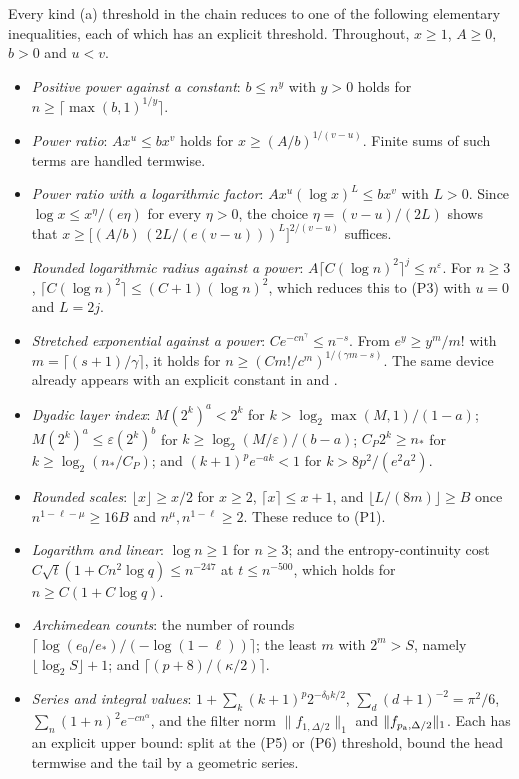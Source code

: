 \documentclass[11pt]{article}
\newcommand{\eps}{\varepsilon}
\begin{document}
Every kind (a) threshold in the chain reduces to one of the following
elementary inequalities, each of which has an explicit threshold. Throughout,
$x\ge1$, $A\ge0$, $b>0$ and $u<v$.
\begin{itemize}
    \item[(P1)] \emph{Positive power against a constant}: $b\le n^y$ with
          $y>0$ holds for $n\ge\lceil\max(b,1)^{1/y}\rceil$.
    \item[(P2)] \emph{Power ratio}: $Ax^u\le bx^v$ holds for
          $x\ge(A/b)^{1/(v-u)}$. Finite sums of such terms are handled termwise.
    \item[(P3)] \emph{Power ratio with a logarithmic factor}:
          $Ax^u(\log x)^L\le bx^v$ with $L>0$. Since
          $\log x\le x^\eta/(e\eta)$ for every $\eta>0$, the choice
          $\eta=(v-u)/(2L)$ shows that
          $x\ge\bigl[(A/b)\,(2L/(e(v-u)))^L\bigr]^{2/(v-u)}$ suffices.
    \item[(P4)] \emph{Rounded logarithmic radius against a power}:
          $A\lceil C(\log n)^2\rceil^j\le n^\eps$. For $n\ge3$,
          $\lceil C(\log n)^2\rceil\le(C+1)(\log n)^2$, which reduces this to
          (P3) with $u=0$ and $L=2j$.
    \item[(P5)] \emph{Stretched exponential against a power}:
          $Ce^{-cn^\gamma}\le n^{-s}$. From $e^y\ge y^m/m!$ with
          $m=\lceil(s+1)/\gamma\rceil$, it holds for
          $n\ge(Cm!/c^m)^{1/(\gamma m-s)}$. The same device already appears with
          an explicit constant in
          and .
    \item[(P6)] \emph{Dyadic layer index}: $M(2^k)^a<2^k$ for
          $k>\log_2\max(M,1)/(1-a)$; $M(2^k)^a\le\eps(2^k)^b$ for
          $k\ge\log_2(M/\eps)/(b-a)$; $C_P2^k\ge n_*$ for
          $k\ge\log_2(n_*/C_P)$; and $(k+1)^pe^{-ak}<1$ for
          $k>8p^2/(e^2a^2)$.
    \item[(P7)] \emph{Rounded scales}: $\lfloor x\rfloor\ge x/2$ for $x\ge2$,
          $\lceil x\rceil\le x+1$, and $\lfloor L/(8m)\rfloor\ge B$ once
          $n^{1-\ell-\mu}\ge16B$ and $n^\mu,n^{1-\ell}\ge2$. These reduce to (P1).
    \item[(P8)] \emph{Logarithm and linear}: $\log n\ge1$ for $n\ge3$; and the
          entropy-continuity cost $C\sqrt t(1+Cn^2\log q)\le n^{-247}$ at
          $t\le n^{-500}$, which holds for $n\ge C(1+C\log q)$.
    \item[(P9)] \emph{Archimedean counts}: the number of rounds
          $\lceil\log(e_0/e_*)/(-\log(1-\ell))\rceil$; the least $m$ with
          $2^m>S$, namely $\lfloor\log_2S\rfloor+1$; and
          $\lceil(p+8)/(\kappa/2)\rceil$.
    \item[(P10)] \emph{Series and integral values}:
          $1+\sum_k(k+1)^p2^{-\delta_0k/2}$, $\sum_d(d+1)^{-2}=\pi^2/6$,
          $\sum_n(1+n)^2e^{-cn^\alpha}$, and the filter norm
          $\|f_{1,\Delta/2}\|_1$ and $\|f_{p_{\rm a},\Delta/2}\|_1$. Each has an explicit upper bound: split at
          the (P5) or (P6) threshold, bound the head termwise and the tail by
          a geometric series.
\end{itemize}
\end{document}
